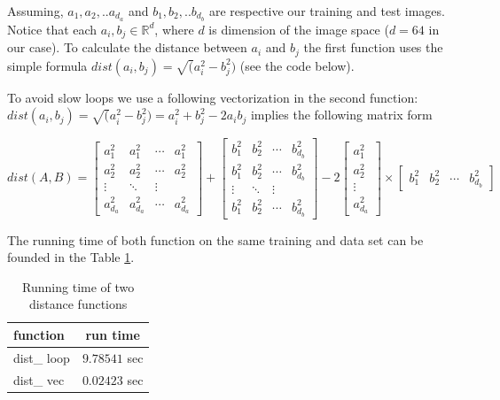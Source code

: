\documentclass{article}
\begin{document}
Assuming, $a_1,a_2,..a_{d_a}$ and $b_1,b_2,..b_{d_b}$ are respective our training and test images. Notice that each $a_i, b_j \in \mathbb{R}^{d}$, where $d$ is dimension  of the image space ($d=64$ in our case). To calculate the distance between $a_i$ and $b_j$ the first function uses the simple formula $dist(a_i,b_j) = \sqrt(a_i^2 - b_j^2)$ (see the code below).




To avoid slow loops we use a following vectorization in the second function:
\vspace*{12pt}
$dist(a_i,b_j) = \sqrt(a_i^2 - b_j^2) = a_i^2+b_j^2-2a_ib_j$ implies the following matrix form

$
dist(A,B) = 
\begin{bmatrix} 
	a_1^2 & a_1^2 & \cdots & a_1^2 \\
	a_2^2 & a_2^2 & \cdots & a_2^2 \\
	\vdots & \ddots & \vdots \\
	a_{d_a}^2 & a_{d_a}^2 & \cdots & a_{d_a}^2
\end{bmatrix}
+
\begin{bmatrix} 
	b_1^2 & b_2^2 & \cdots & b_{d_b}^2 \\
	b_1^2 & b_2^2 & \cdots & b_{d_b}^2 \\
	\vdots & \ddots & \vdots \\
	b_1^2 & b_2^2 & \cdots & b_{d_b}^2
\end{bmatrix}
-2
\left[ 
\begin{array}{c}
	 a_1^2 \\ a_2^2  \\ \vdots \\ a_{d_a}^2 \end{array} \right]
	 \times
	 \left[ \begin{array}{cccc} b_1^2 & b_2^2 & \cdots & b_{d_b}^2 \end{array} \right] 
$

\vspace*{12pt}

\vspace*{12pt}
The running time of both function on the same training and data set can be founded in the Table \ref{Tab1}.

\begin{table}[htb]
	\centering
	\begin{tabular}{|l | c|}
		\hline
		function & run time \\ \hline
		dist\_ loop & $9.78541$ sec \\ 
		dist\_ vec &  $0.02423$ sec\\ \hline 
	\end{tabular}
\caption{Running time of two distance functions}
\label{Tab1}
\end{table}
\end{document}

